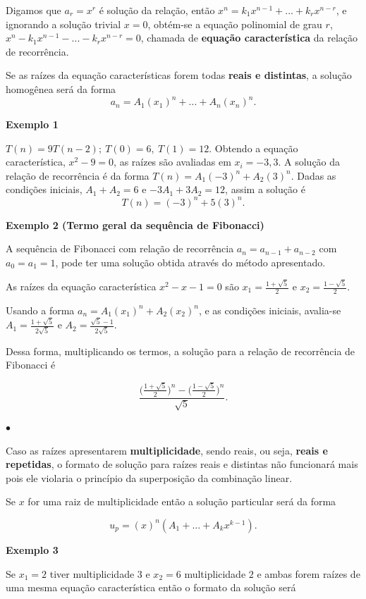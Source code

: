 Digamos que $a_r = x^r$ é solução da relação, então $x^n = k_1x^{n-1}+...+k_rx^{n-r}$, e ignorando a solução trivial $x=0$, obtém-se a equação polinomial de grau $r$, $x^n - k_1x^{n-1}-...-k_rx^{n-r} = 0$, chamada de \textbf{equação característica} da relação de recorrência.

Se as raízes da equação características forem todas \textbf{reais e distintas}, a solução homogênea será da forma
\[a_n = A_1(x_1)^n + ... + A_n(x_n)^n.\]

\textbf{Exemplo 1}

$T(n) = 9T(n-2); \ T(0) = 6,  \ T(1) = 12$. Obtendo a equação característica, $x^2 - 9 = 0$, as raízes são avaliadas em $x_i = {-3,3}$. A solução da relação de recorrência é da forma $T(n) = A_1(-3)^n + A_2(3)^n$. Dadas as condições iniciais, $A_1 + A_2 = 6$ e $-3A_1 + 3A_2 = 12$, assim a solução é 
\[T(n) = (-3)^n + 5(3)^n.\]

\textbf{Exemplo 2 (Termo geral da sequência de Fibonacci)}

A sequência de Fibonacci com relação de recorrência $a_n = a_{n-1} + a_{n-2}$ com $a_0 = a_1 = 1$, pode ter uma solução obtida através do método apresentado.

As raízes da equação característica $x^2 - x - 1 = 0$ são $x_1 = \frac{1+\sqrt{5}}{2}$ e $x_2 = \frac{1 - \sqrt{5}}{2}$.

Usando a forma $a_n = A_1(x_1)^n + A_2(x_2)^n$, e as condições iniciais, avalia-se $A_1 = \frac{1 + \sqrt{5}}{2\sqrt{5}}$ e $A_2 = \frac{\sqrt{5} - 1 }{2\sqrt{5}}$.

Dessa forma, multiplicando os termos, a solução para a relação de recorrência de Fibonacci é 

\[\frac{\Bigr(\frac{1+\sqrt{5}}{2}\Bigr)^n-\Bigr(\frac{1 - \sqrt{5}}{2}\Bigr)^n}{\sqrt{5}}.\]

{\raggedleft $\bullet$ \par}

Caso as raízes apresentarem \textbf{multiplicidade}, sendo reais, ou seja, \textbf{reais e repetidas}, o formato de solução para raízes reais e distintas não funcionará mais pois ele violaria o princípio da superposição da combinação linear.

Se $x$ for uma raiz de multiplicidade então a solução particular será da forma

\[u_p = (x)^n(A_1 + ... + A_{k}x^{k-1}).\]

\textbf{Exemplo 3}

Se $x_1 = 2$ tiver multiplicidade $3$ e $x_2 = 6$ multiplicidade $2$ e ambas forem raízes de uma mesma equação característica então o formato da solução será

